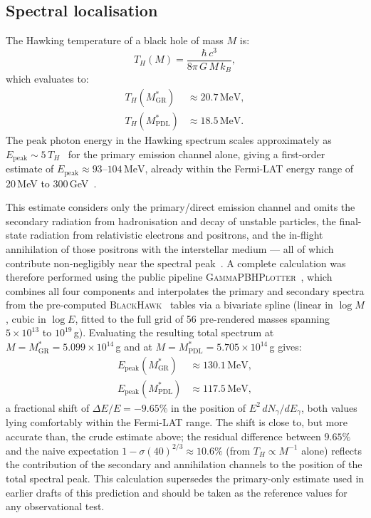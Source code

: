 \documentclass[12pt, a4paper]{article}
\theoremstyle{definition}
\newcommand{\MstarGR}{M^{*}_{\mathrm{GR}}}
\newcommand{\MstarPDL}{M^{*}_{\mathrm{PDL}}}
\begin{document}
\subsection{Spectral localisation}
\label{sec:peak}

The Hawking temperature of a black hole of mass $M$ is:
\begin{equation}
  T_H(M) = \frac{\hbar\,c^3}{8\pi\,G\,M\,k_B},
\end{equation}
which evaluates to:
\begin{align}
  T_H(\MstarGR)  &\approx 20.7\,\mathrm{MeV}, \\
  T_H(\MstarPDL) &\approx 18.5\,\mathrm{MeV}.
\end{align}
The peak photon energy in the Hawking spectrum scales approximately as $E_{\mathrm{peak}} \sim 5\,T_H$~\cite{MacGibbon1991} for the primary emission channel alone, giving a first-order estimate of $E_{\mathrm{peak}} \approx 93$--$104\,\mathrm{MeV}$, already within the Fermi-LAT energy range of 20\,MeV to 300\,GeV~\cite{Atwood2009}.

This estimate considers only the primary/direct emission channel and omits the secondary radiation from hadronisation and decay of unstable particles, the final-state radiation from relativistic electrons and positrons, and the in-flight annihilation of those positrons with the interstellar medium --- all of which contribute non-negligibly near the spectral peak~\cite{Carlini2025}. A complete calculation was therefore performed using the public pipeline \textsc{GammaPBHPlotter}~\cite{Carlini2025}, which combines all four components and interpolates the primary and secondary spectra from the pre-computed \textsc{BlackHawk}~\cite{BlackHawk} tables via a bivariate spline (linear in $\log M$, cubic in $\log E$, fitted to the full grid of 56 pre-rendered masses spanning $5\times10^{13}$ to $10^{19}$\,g). Evaluating the resulting total spectrum at $M=\MstarGR=5.099\times10^{14}$\,g and at $M=\MstarPDL=5.705\times10^{14}$\,g gives:
\begin{align}
  E_{\mathrm{peak}}(\MstarGR)  &\approx 130.1\,\mathrm{MeV}, \\
  E_{\mathrm{peak}}(\MstarPDL) &\approx 117.5\,\mathrm{MeV},
\end{align}
a fractional shift of $\Delta E/E = -9.65\%$ in the position of $E^2\,dN_\gamma/dE_\gamma$, both values lying comfortably within the Fermi-LAT range. The shift is close to, but more accurate than, the crude estimate above; the residual difference between $9.65\%$ and the naive expectation $1-\sigma(40)^{2/3}\approx10.6\%$ (from $T_H\propto M^{-1}$ alone) reflects the contribution of the secondary and annihilation channels to the position of the total spectral peak. This calculation supersedes the primary-only estimate used in earlier drafts of this prediction and should be taken as the reference values for any observational test.
\end{document}
